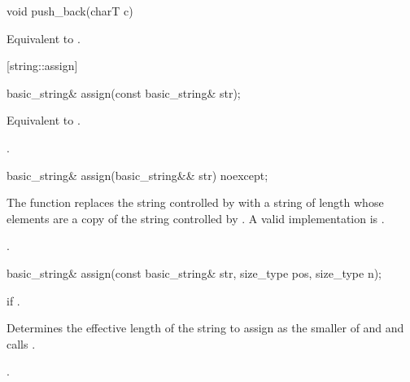 %
%
\begin{itemdecl}
void push_back(charT c)
\end{itemdecl}

\begin{itemdescr}
\pnum
\effects
Equivalent to
.
\end{itemdescr}

[string::assign]{}

%
%
\begin{itemdecl}
basic_string& assign(const basic_string& str);
\end{itemdecl}

\begin{itemdescr}
\pnum
\effects Equivalent to .

\pnum
\returns
{}.
\end{itemdescr}

%
%
\begin{itemdecl}
basic_string& assign(basic_string&& str) noexcept;
\end{itemdecl}

\begin{itemdescr}
\effects The function replaces the string controlled by
with a string of length  whose elements are a copy of the
string controlled by .
\enternote A valid implementation is
. \exitnote

\pnum
\returns
{}.
\end{itemdescr}


%
%
\begin{itemdecl}
basic_string&
  assign(const basic_string& str, size_type pos,
         size_type n);
\end{itemdecl}

\begin{itemdescr}
\pnum
\requires
{}

\pnum
\throws
{}
if
.

\pnum
\effects
Determines the effective length 
of the string to assign as the smaller of  and
 and calls
.

\pnum
\returns
{}.
\end{itemdescr}

